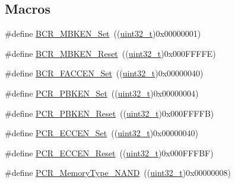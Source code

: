 \subsection*{Macros}
\begin{DoxyCompactItemize}
\item 
\#define \hyperlink{group___f_s_m_c___private___defines_ga3c427afcf32b17fb72be67fd4638e6d5}{B\+C\+R\+\_\+\+M\+B\+K\+E\+N\+\_\+\+Set}~((\hyperlink{_p_e___types_8h_a33594304e786b158f3fb30289278f5af}{uint32\+\_\+t})0x00000001)
\item 
\#define \hyperlink{group___f_s_m_c___private___defines_gaa63b72d32a32c53a057ee0a45bed0d3b}{B\+C\+R\+\_\+\+M\+B\+K\+E\+N\+\_\+\+Reset}~((\hyperlink{_p_e___types_8h_a33594304e786b158f3fb30289278f5af}{uint32\+\_\+t})0x000\+F\+F\+F\+F\+E)
\item 
\#define \hyperlink{group___f_s_m_c___private___defines_ga38da33a73789b2c932962d75dfc1341f}{B\+C\+R\+\_\+\+F\+A\+C\+C\+E\+N\+\_\+\+Set}~((\hyperlink{_p_e___types_8h_a33594304e786b158f3fb30289278f5af}{uint32\+\_\+t})0x00000040)
\item 
\#define \hyperlink{group___f_s_m_c___private___defines_gade871050f882b7f48582084b0e95f67c}{P\+C\+R\+\_\+\+P\+B\+K\+E\+N\+\_\+\+Set}~((\hyperlink{_p_e___types_8h_a33594304e786b158f3fb30289278f5af}{uint32\+\_\+t})0x00000004)
\item 
\#define \hyperlink{group___f_s_m_c___private___defines_gac6d0ddc3888a0554b032f0f484cfe332}{P\+C\+R\+\_\+\+P\+B\+K\+E\+N\+\_\+\+Reset}~((\hyperlink{_p_e___types_8h_a33594304e786b158f3fb30289278f5af}{uint32\+\_\+t})0x000\+F\+F\+F\+F\+B)
\item 
\#define \hyperlink{group___f_s_m_c___private___defines_ga8a0d7950936e3869b449d421e03a19ac}{P\+C\+R\+\_\+\+E\+C\+C\+E\+N\+\_\+\+Set}~((\hyperlink{_p_e___types_8h_a33594304e786b158f3fb30289278f5af}{uint32\+\_\+t})0x00000040)
\item 
\#define \hyperlink{group___f_s_m_c___private___defines_gaca1a5c5cd46c8a32dab58c3eb3b865fa}{P\+C\+R\+\_\+\+E\+C\+C\+E\+N\+\_\+\+Reset}~((\hyperlink{_p_e___types_8h_a33594304e786b158f3fb30289278f5af}{uint32\+\_\+t})0x000\+F\+F\+F\+B\+F)
\item 
\#define \hyperlink{group___f_s_m_c___private___defines_gaf3992efb285ab994c41463af5107c501}{P\+C\+R\+\_\+\+Memory\+Type\+\_\+\+N\+A\+ND}~((\hyperlink{_p_e___types_8h_a33594304e786b158f3fb30289278f5af}{uint32\+\_\+t})0x00000008)
\end{DoxyCompactItemize}
